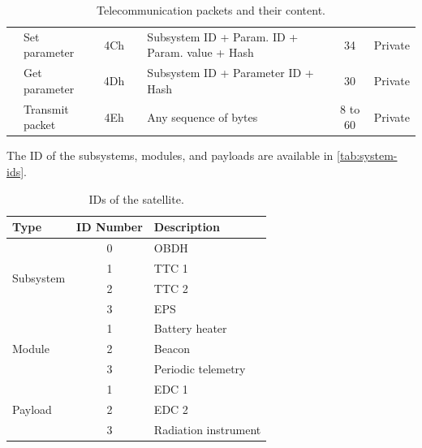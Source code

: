 \begin{landscape}
\begin{table}[ht]
\begin{tabular}{L{1.8cm}lcllcc}
                                     & Set parameter       & 4Ch &                                     & Subsystem ID + Param. ID + Param. value + Hash    & 34        & Private \\
                                     & Get parameter       & 4Dh &                                     & Subsystem ID + Parameter ID + Hash                & 30        & Private \\
                                     & Transmit packet     & 4Eh &                                     & Any sequence of bytes                             & 8 to 60   & Private \\
            \bottomrule[1.5pt]
        \end{tabular}
        \caption{Telecommunication packets and their content.}
        \label{tab:packets-struct}
    \end{table}
\end{landscape}

The ID of the subsystems, modules, and payloads are available in \autoref{tab:system-ids}.

\begin{table}[ht]
    \centering
    \begin{tabular}{lcl}
        \toprule[1.5pt]
        \textbf{Type} & \textbf{ID Number} & \textbf{Description} \\
        \midrule
        \multirow{4}{*}{Subsystem} & 0 & OBDH \\
                                   & 1 & TTC 1 \\
                                   & 2 & TTC 2 \\
                                   & 3 & EPS \\
        \midrule
        \multirow{3}{*}{Module}    & 1 & Battery heater \\
                                   & 2 & Beacon \\
                                   & 3 & Periodic telemetry \\
        \midrule
        \multirow{4}{*}{Payload}   & 1 & EDC 1 \\
                                   & 2 & EDC 2 \\
                                   & 3 & Radiation instrument \\
        \bottomrule[1.5pt]
    \end{tabular}
    \caption{IDs of the satellite.}
    \label{tab:system-ids}
\end{table}

